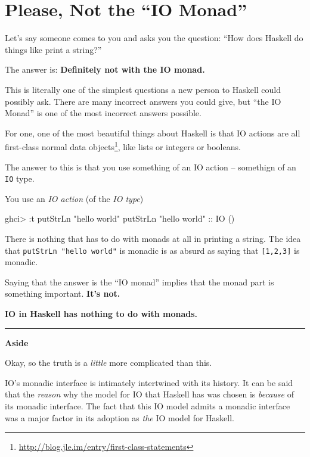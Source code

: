 \documentclass[]{article}
\newenvironment{Shaded}{}{}
\newcommand{\DataTypeTok}[1]{\textcolor[rgb]{0.56,0.13,0.00}{{#1}}}
\newcommand{\StringTok}[1]{\textcolor[rgb]{0.25,0.44,0.63}{{#1}}}
\newcommand{\OtherTok}[1]{\textcolor[rgb]{0.00,0.44,0.13}{{#1}}}
\newcommand{\FunctionTok}[1]{\textcolor[rgb]{0.02,0.16,0.49}{{#1}}}
\newcommand{\NormalTok}[1]{{#1}}
\renewcommand{\href}[2]{#2\footnote{\url{#1}}}
\begin{document}
\section{\texorpdfstring{Please, Not the ``IO
Monad''}{Please, Not the IO Monad}}\label{please-not-the-io-monad}

Let's say someone comes to you and asks you the question: ``How does
Haskell do things like print a string?''

The answer is: \textbf{Definitely not with the IO monad.}

This is literally one of the simplest questions a new person to Haskell
could possibly ask. There are many incorrect answers you could give, but
``the IO Monad'' is one of the most incorrect answers possible.

For one, one of the most beautiful things about Haskell is that IO
actions are all
\href{http://blog.jle.im/entry/first-class-statements}{first-class
normal data objects}, like lists or integers or booleans.

The answer to this is that you use something of an IO action --
somethign of an \texttt{IO} type.

You use an \emph{IO action} (of the \emph{IO type})

\begin{Shaded}
\begin{Highlighting}[]
\NormalTok{ghci}\FunctionTok{>} \FunctionTok{:}\NormalTok{t putStrLn }\StringTok{"hello world"}
\NormalTok{putStrLn }\StringTok{"hello world"}\OtherTok{ ::} \DataTypeTok{IO} \NormalTok{()}
\end{Highlighting}
\end{Shaded}

There is nothing that has to do with monads at all in printing a string.
The idea that \texttt{putStrLn\ "hello\ world"} is monadic is as absurd
as saying that \texttt{{[}1,2,3{]}} is monadic.

Saying that the answer is the ``IO monad'' implies that the monad part
is something important. \textbf{It's not.}

\textbf{IO in Haskell has nothing to do with monads.}

\begin{center}\rule{0.5\linewidth}{\linethickness}\end{center}

\textbf{Aside}

Okay, so the truth is a \emph{little} more complicated than this.

IO's monadic interface is intimately intertwined with its history. It
can be said that the \emph{reason} why the model for IO that Haskell has
was chosen is \emph{because} of its monadic interface. The fact that
this IO model admits a monadic interface was a major factor in its
adoption as \emph{the} IO model for Haskell.
\end{document}
